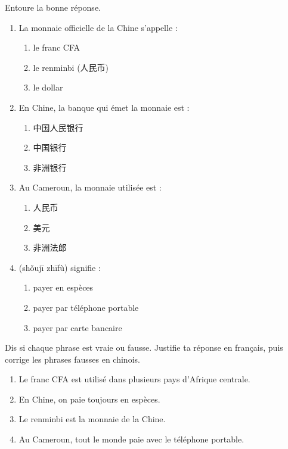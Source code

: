 \documentclass[11pt]{article}
\newcommand{\zh}[1]{\ifmmode\text{#1}\else{#1}\fi}
\begin{document}
\begin{exercice}
Entoure la bonne réponse.
\begin{enumerate}
\item La monnaie officielle de la Chine s'appelle :
\begin{enumerate}
\item le franc CFA \item le renminbi (人民币) \item le dollar
\end{enumerate}
\item En Chine, la banque qui émet la monnaie est :
\begin{enumerate}
\item 中国人民银行 \item 中国银行 \item 非洲银行
\end{enumerate}
\item Au Cameroun, la monnaie utilisée est :
\begin{enumerate}
\item 人民币 \item 美元 \item 非洲法郎
\end{enumerate}
\item \zh{手机支付} (shǒujī zhīfù) signifie :
\begin{enumerate}
\item payer en espèces \item payer par téléphone portable \item payer par carte bancaire
\end{enumerate}
\end{enumerate}
\end{exercice}

\begin{exercice}
Dis si chaque phrase est vraie ou fausse. Justifie ta réponse en français, puis corrige les phrases fausses en chinois.
\begin{enumerate}
\item Le franc CFA est utilisé dans plusieurs pays d'Afrique centrale.
\item En Chine, on paie toujours en espèces.
\item Le renminbi est la monnaie de la Chine.
\item Au Cameroun, tout le monde paie avec le téléphone portable.
\end{enumerate}
\end{exercice}
\end{document}
